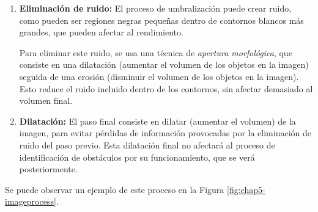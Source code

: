 \begin{enumerate}
	\item \textbf{Eliminación de ruido:} El proceso de umbralización puede crear ruido, como pueden ser regiones negras pequeñas dentro de contornos blancos más grandes, que pueden afectar al rendimiento.
	
	Para eliminar este ruido, se usa una técnica de \textit{apertura morfológica}, que consiste en una dilatación (aumentar el volumen de los objetos en la imagen) seguida de una erosión (disminuir el volumen de los objetos en la imagen). Esto reduce el ruido incluido dentro de los contornos, sin afectar demasiado al volumen final.
	
	\item \textbf{Dilatación:} El paso final consiste en dilatar (aumentar el volumen) de la imagen, para evitar pérdidas de información provocadas por la eliminación de ruido del paso previo. Esta dilatación final no afectará al proceso de identificación de obstáculos por su funcionamiento, que se verá posteriormente.
\end{enumerate}

Se puede observar un ejemplo de este proceso en la Figura \ref{fig:chap5-imageprocess}.

